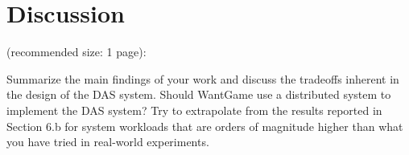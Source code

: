 \section{Discussion}
(recommended size: 1 page): 

Summarize the main findings of your work
and discuss the tradeoffs inherent in the design of the DAS system. Should WantGame
use a distributed system to implement the DAS system? Try to extrapolate from the
results reported in Section 6.b for system workloads that are orders of magnitude
higher than what you have tried in real-world experiments.